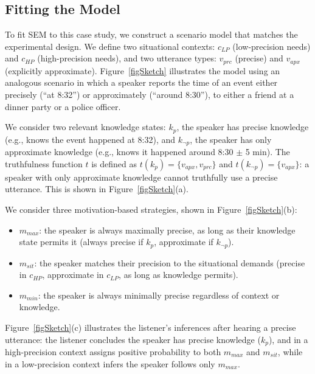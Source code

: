 \documentclass[12pt,a4paper]{article}
\begin{document}


\subsection{Fitting the Model}

To fit SEM to this case study, we construct a scenario model that matches the
experimental design. We define two situational contexts: $c_{LP}$ (low-precision
needs) and $c_{HP}$ (high-precision needs), and two utterance types: $v_{prc}$
(precise) and $v_{apx}$ (explicitly approximate). Figure~\ref{figSketch}
illustrates the model using an analogous scenario in which a speaker reports the
time of an event either precisely (``at 8:32'') or approximately (``around
8:30''), to either a friend at a dinner party or a police officer.

We consider two relevant knowledge states: $k_p$, the speaker has precise
knowledge (e.g., knows the event happened at 8:32), and $k_{\neg p}$, the
speaker has only approximate knowledge (e.g., knows it happened around 8:30
$\pm$ 5 min). The truthfulness function $t$ is defined as $t(k_p) = \{v_{apx},
v_{prc}\}$ and $t(k_{\neg p}) = \{v_{apx}\}$: a speaker with only approximate
knowledge cannot truthfully use a precise utterance. This is shown in
Figure~\ref{figSketch}(a).

We consider three motivation-based strategies, shown in Figure~\ref{figSketch}(b):

\begin{itemize}
\item $m_{max}$: the speaker is always maximally precise, as long as their
knowledge state permits it (always precise if $k_p$, approximate if $k_{\neg p}$).

\item $m_{sit}$: the speaker matches their precision to the situational demands
(precise in $c_{HP}$, approximate in $c_{LP}$, as long as knowledge permits).

\item $m_{min}$: the speaker is always minimally precise regardless of context
or knowledge.
\end{itemize}

\noindent Figure~\ref{figSketch}(c) illustrates the listener's inferences after
hearing a precise utterance: the listener concludes the speaker has precise
knowledge ($k_p$), and in a high-precision context assigns positive probability
to both $m_{max}$ and $m_{sit}$, while in a low-precision context infers the
speaker follows only $m_{max}$.
\end{document}
